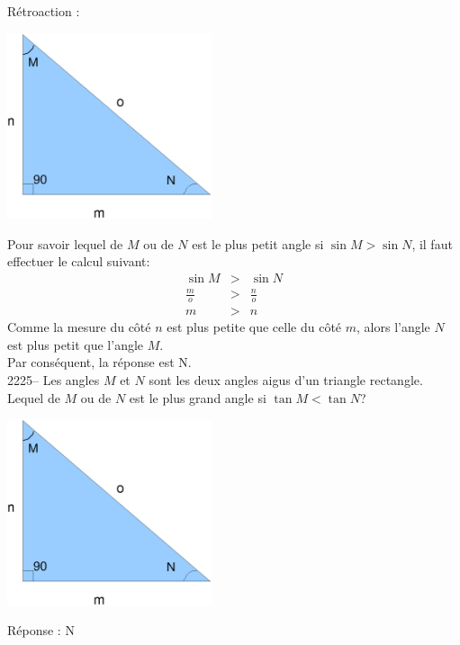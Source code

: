 \documentclass[letterpaper, 12pt]{article}
\begin{document}
R\'etroaction :\\
\begin{center}
 \includegraphics[width=6cm,bb=14 14 583 529]{Triangle_rectangle3.eps}
\end{center}
Pour savoir lequel de $M$ ou de $N$ est le plus petit angle si $\sin{M}>\sin{N}$, il faut effectuer le calcul suivant:
\begin{eqnarray*}
 \sin{M}&>&\sin{N}\\[2mm]
\frac{m}{o}&>&\frac{n}{o}\\[2mm]
m&>&n
\end{eqnarray*}
Comme la mesure du c\^ot\'e $n$ est plus petite que celle du c\^ot\'e $m$, alors l'angle $N$ est plus petit que l'angle $M$.\\
Par cons\'equent, la r\'eponse est N.\\

2225-- Les angles $M$ et $N$ sont les deux angles aigus d'un triangle rectangle. Lequel de $M$ ou de $N$ est le plus grand angle si $\tan{M}<\tan{N}$? \\
\begin{center}
 \includegraphics[width=6cm,bb=14 14 583 529]{Triangle_rectangle3.eps}
\end{center}

R\'eponse : N\\
\end{document}
